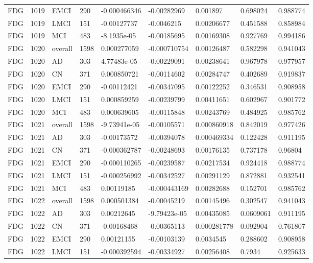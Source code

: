 \begin{landscape}
\begin{longtable}{lllllllll}
FDG & 1019 & EMCI & 290 & -0.000466346 & -0.00282969 & 0.001897 & 0.698024 & 0.988774 \\
FDG & 1019 & LMCI & 151 & -0.00127737 & -0.0046215 & 0.00206677 & 0.451588 & 0.858984 \\
FDG & 1019 & MCI & 483 & -8.1935e-05 & -0.00185695 & 0.00169308 & 0.927769 & 0.994186 \\
FDG & 1020 & overall & 1598 & 0.000277059 & -0.000710754 & 0.00126487 & 0.582298 & 0.941043 \\
FDG & 1020 & AD & 303 & 4.77483e-05 & -0.00229091 & 0.00238641 & 0.967978 & 0.977957 \\
FDG & 1020 & CN & 371 & 0.000850721 & -0.00114602 & 0.00284747 & 0.402689 & 0.919837 \\
FDG & 1020 & EMCI & 290 & -0.00112421 & -0.00347095 & 0.00122252 & 0.346531 & 0.908958 \\
FDG & 1020 & LMCI & 151 & 0.000859259 & -0.00239799 & 0.00411651 & 0.602967 & 0.901772 \\
FDG & 1020 & MCI & 483 & 0.000639605 & -0.00115848 & 0.00243769 & 0.484925 & 0.985762 \\
FDG & 1021 & overall & 1598 & -9.73941e-05 & -0.00105571 & 0.000860918 & 0.842019 & 0.977426 \\
FDG & 1021 & AD & 303 & -0.00173572 & -0.00394078 & 0.000469334 & 0.122428 & 0.911195 \\
FDG & 1021 & CN & 371 & -0.000362787 & -0.00248693 & 0.00176135 & 0.737178 & 0.96804 \\
FDG & 1021 & EMCI & 290 & -0.000110265 & -0.00239587 & 0.00217534 & 0.924418 & 0.988774 \\
FDG & 1021 & LMCI & 151 & -0.000256992 & -0.00342527 & 0.00291129 & 0.872881 & 0.932541 \\
FDG & 1021 & MCI & 483 & 0.00119185 & -0.000443169 & 0.00282688 & 0.152701 & 0.985762 \\
FDG & 1022 & overall & 1598 & 0.000501384 & -0.00045219 & 0.00145496 & 0.302547 & 0.941043 \\
FDG & 1022 & AD & 303 & 0.00212645 & -9.79423e-05 & 0.00435085 & 0.0609061 & 0.911195 \\
FDG & 1022 & CN & 371 & -0.00168468 & -0.00365113 & 0.000281778 & 0.092904 & 0.761807 \\
FDG & 1022 & EMCI & 290 & 0.00121155 & -0.00103139 & 0.0034545 & 0.288602 & 0.908958 \\
FDG & 1022 & LMCI & 151 & -0.000392594 & -0.00334927 & 0.00256408 & 0.7934 & 0.925633 \\

\end{longtable}
\end{landscape}
